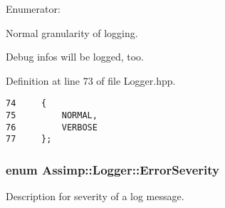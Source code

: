 \begin{Desc}
\item[Enumerator: ]\par
\begin{description}
\item[{\em 
\hypertarget{class_assimp_1_1_logger_8b6248a0fd062431e8572556350d29e679d16f85dc21486ee489f300027e8eda}{
NORMAL}
\label{class_assimp_1_1_logger_8b6248a0fd062431e8572556350d29e679d16f85dc21486ee489f300027e8eda}
}]Normal granularity of logging. \item[{\em 
\hypertarget{class_assimp_1_1_logger_8b6248a0fd062431e8572556350d29e6fc9d1d86aa82fdb80e00c99b3c1ce486}{
VERBOSE}
\label{class_assimp_1_1_logger_8b6248a0fd062431e8572556350d29e6fc9d1d86aa82fdb80e00c99b3c1ce486}
}]Debug infos will be logged, too. \end{description}
\end{Desc}



Definition at line 73 of file Logger.hpp.

\begin{Code}\begin{verbatim}74     {
75         NORMAL,     
76         VERBOSE     
77     };
\end{verbatim}
\end{Code}


\hypertarget{class_assimp_1_1_logger_cd0b52a87d6fc11e957ed2c6e2ad75b6}{
\subsubsection[ErrorSeverity]{\setlength{\rightskip}{0pt plus 5cm}enum {\bf Assimp::Logger::ErrorSeverity}}}
\label{class_assimp_1_1_logger_cd0b52a87d6fc11e957ed2c6e2ad75b6}


Description for severity of a log message. 

